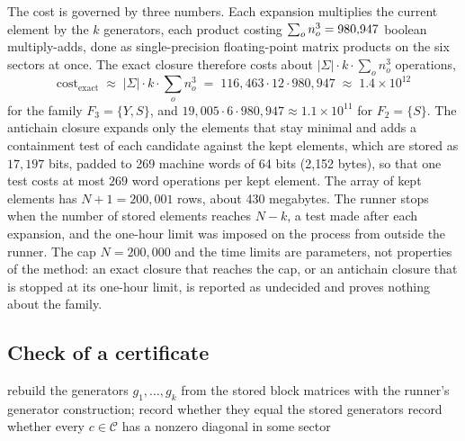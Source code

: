 The cost is governed by three numbers. Each expansion multiplies the current element by the $k$ generators, each product
costing $\sum_o n_o^3 = 980{,}947$ boolean multiply-adds, done as single-precision floating-point matrix products on the six sectors at once. The exact closure
therefore costs about $|\Sigma|\cdot k \cdot \sum_o n_o^3$ operations,
\begin{equation}\label{eq:cost}
\mathrm{cost}_{\mathrm{exact}} \;\approx\; |\Sigma| \cdot k \cdot \sum_o n_o^3 \;=\; 116{,}463 \cdot 12 \cdot 980{,}947 \;\approx\; 1.4\times 10^{12}
\end{equation}
for the family $F_3 = \{Y, S\}$, and $19{,}005\cdot 6\cdot 980{,}947 \approx 1.1\times 10^{11}$ for $F_2 = \{S\}$. The antichain
closure expands only the elements that stay minimal and adds a containment test of each candidate against the kept elements,
which are stored as $17{,}197$ bits, padded to 269 machine words of 64 bits (2{,}152 bytes), so that one test costs at most $269$ word
operations per kept element. The array of kept elements has $N + 1 = 200{,}001$ rows, about 430 megabytes. The runner stops when the number of stored elements reaches $N - k$, a test made after each expansion, and the one-hour limit was imposed on the process from outside the runner. The cap $N = 200{,}000$ and the time limits are
parameters, not properties of the method: an exact closure that reaches the cap, or an antichain closure that is stopped at its one-hour
limit, is reported as undecided and proves nothing about the family.

\subsection{Check of a certificate}\label{sec:alg-check}

\begin{algorithm}[t]
\caption{Certificate check with integer products.}\label{alg:check}
\DontPrintSemicolon
{}
rebuild the generators $g_1, \dots, g_k$ from the stored block matrices with the runner's generator construction; record whether they equal the stored generators\;
record whether every $c \in \mathcal{C}$ has a nonzero diagonal in some sector\;
\end{algorithm}

